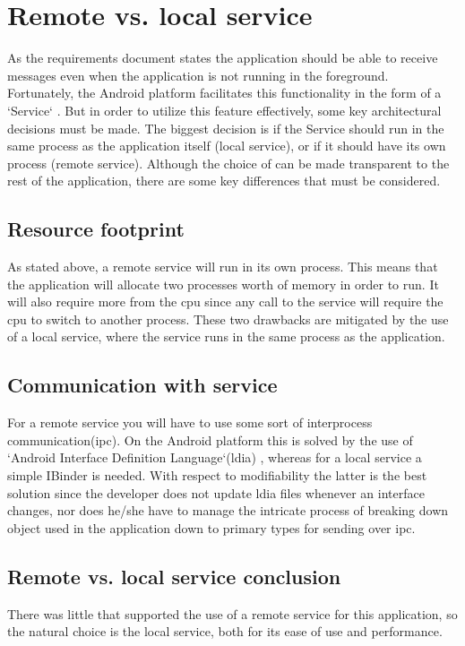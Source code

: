

\section{Remote vs. local service}\label{sec:rlservice}

As the requirements document states the application should be able to receive messages even when the application is not running in the foreground. Fortunately, the Android platform facilitates this functionality in the form of a `Service` \cite{bib:service}. But in order to utilize this feature effectively, some key architectural decisions must be made. The biggest decision is if the Service should run in the same process as the application itself (local service), or if it should have its own process (remote service). Although the choice of can be made transparent to the rest of the application, there are some key differences that must be considered.

\subsection{Resource footprint}
As stated above, a remote service will run in its own process. This means that the application will allocate two processes worth of memory in order to run. It will also require more from the \gls{cpu} since any call to the service will require the \gls{cpu} to switch to another process. These two drawbacks are mitigated by the use of a local service, where the service runs in the same process as the application. 

\subsection{Communication with service}
For a remote service you will have to use some sort of  interprocess communication(\gls{ipc}). On the Android platform this is solved by the use of `Android Interface Definition Language`(\gls{ldia}) \cite{bib:aidl}, whereas for a local service a simple IBinder \cite{bib:ibinder} is needed. With respect to modifiability the latter is the best solution since the developer does not update \gls{ldia} files whenever an interface changes, nor does he/she have to manage the intricate process of breaking down object used in the application down to primary types for sending over \gls{ipc}.

\subsection{Remote vs. local service conclusion}
There was little that supported the use of a remote service for this application, so the natural choice is the local service, both for its ease of use and performance.




